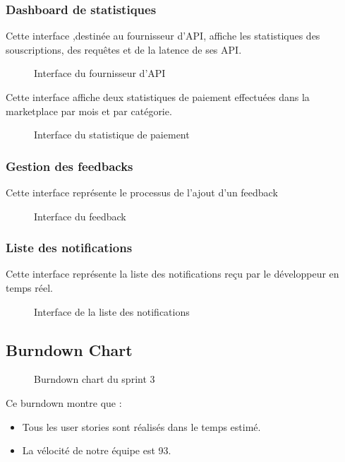     \subsubsection{Dashboard de statistiques}
    Cette interface ,destinée au fournisseur d'API, affiche les statistiques des souscriptions, des requêtes et de la latence de ses API. 
    \begin{figure}[H]
        \centering
        \caption{ Interface du fournisseur d'API }
        \label{fig:logo_tt}
    \end{figure}


    Cette interface affiche deux statistiques de paiement effectuées dans la marketplace par mois et par catégorie.
    \begin{figure}[H]
        \centering
        \caption{ Interface du statistique de paiement }
        \label{fig:logo_tt}
    \end{figure}

    \subsubsection{Gestion des feedbacks}

    Cette interface représente le processus de l'ajout d'un feedback 
    \begin{figure}[H]
        \centering
        \caption{ Interface du feedback }
        \label{fig:logo_tt}
    \end{figure}
    \subsubsection{Liste des notifications}

    Cette interface représente la liste des notifications reçu par le développeur en temps réel. 
    \begin{figure}[H]
        \centering
        \caption{ Interface de la liste des notifications}
        \label{fig:logo_tt}
    \end{figure}
    
\pagebreak
    \subsection{Burndown Chart}
    \begin{figure}[H]
        \centering
        \caption{Burndown chart du sprint 3 }
        \label{fig:logo_tt}
    \end{figure}
    Ce burndown montre que :
    \begin{itemize}
        \item Tous les user stories sont réalisés dans le temps estimé.
        \item La vélocité de notre équipe est 93.
    \end{itemize}
    

